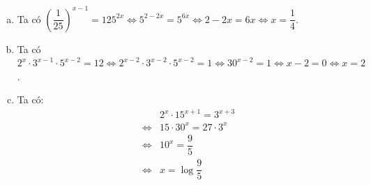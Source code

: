 \begin{vd}
{\begin{enumerate}[a)]
			\item Ta có $\left(\dfrac{1}{25}\right)^{x-1}=125^{2x} \Leftrightarrow 5^{2-2x}=5^{6x} \Leftrightarrow 2-2x=6x \Leftrightarrow x=\dfrac{1}{4}$.
			\item Ta có  $2^x\cdot 3^{x-1}\cdot 5^{x-2}=12\Leftrightarrow 2^{x-2}\cdot 3^{x-2}\cdot 5^{x-2}=1\Leftrightarrow 30^{x-2}=1\Leftrightarrow x-2=0\Leftrightarrow x=2$.
			\item Ta có:  
			\begin{eqnarray*}
				&&2^x\cdot 15^{x+1}=3^{x+3}\\
				&\Leftrightarrow& 15\cdot 30^x=27\cdot 3^x\\
				&\Leftrightarrow& 10^x=\dfrac{9}{5}\\
				&\Leftrightarrow& x=\log \dfrac{9}{5}
			\end{eqnarray*}
	\end{enumerate}}
\end{vd} 

